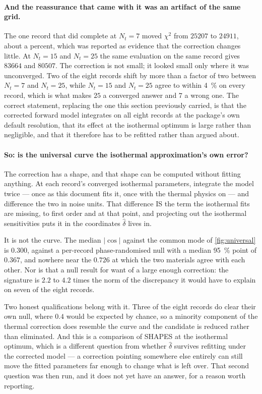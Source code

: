 \documentclass[10pt]{article}
\begin{document}
\paragraph{And the reassurance that came with it was an artifact of the same grid.} The one
record that did complete at $N_t = 7$ moved $\chi^2$ from $25207$ to $24911$, about a percent,
which was reported as evidence that the correction changes little. At $N_t = 15$ and $N_t = 25$
the same evaluation on the same record gives $83664$ and $80507$. The correction is not small;
it looked small only where it was unconverged. Two of the eight records shift by more than a
factor of two between $N_t = 7$ and $N_t = 25$, while $N_t = 15$ and $N_t = 25$ agree to within
\SI{4}{\percent} on every record, which is what makes $25$ a converged answer and $7$ a wrong
one. The correct statement, replacing the one this section previously carried, is that the
corrected forward model integrates on all eight records at the package's own default resolution,
that its effect at the isothermal optimum is large rather than negligible, and that it therefore
has to be refitted rather than argued about.

\paragraph{So: is the universal curve the isothermal approximation's own error?} The correction
has a shape, and that shape can be computed without fitting anything. At each record's converged
isothermal parameters, integrate the model twice --- once as this document fits it, once with
the thermal physics on --- and difference the two in noise units. That difference IS the term
the isothermal fits are missing, to first order and at that point, and projecting out the
isothermal sensitivities puts it in the coordinates $\hat\delta$ lives in.

It is not the curve. The median $\lvert\cos\rvert$ against the common mode of
\cref{fig:universal} is $0.300$, against a per-record phase-randomised null with a median
\SI{95}{\percent} point of $0.367$, and nowhere near the $0.726$ at which the two materials
agree with each other. Nor is that a null result for want of a large enough correction: the
signature is $2.2$ to $4.2$ times the norm of the discrepancy it would have to explain on seven
of the eight records.

Two honest qualifications belong with it. Three of the eight records do clear their own null,
where $0.4$ would be expected by chance, so a minority component of the thermal correction does
resemble the curve and the candidate is reduced rather than eliminated. And this is a comparison
of SHAPES at the isothermal optimum, which is a different question from whether $\hat\delta$
survives refitting under the corrected model --- a correction pointing somewhere else entirely
can still move the fitted parameters far enough to change what is left over. That second
question was then run, and it does not yet have an answer, for a reason worth reporting.
\end{document}
